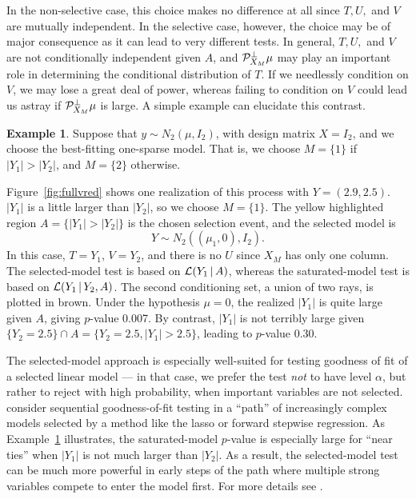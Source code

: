 \documentclass{article}
\theoremstyle{definition}
\newtheorem{example}{Example}
\newcommand{\bX}{X}
\newcommand{\proj}{\cP}
\newcommand{\cL}{\mathcal{L}}
\begin{document}
In the non-selective case, this choice makes no difference at all since $T, U,$ and $V$ are mutually independent.
In the selective case, however, the choice may be of major consequence as it can lead to very different tests. In general, $T, U,$ and $V$ are not conditionally independent given $A$, and $\proj_{\bX_M}^\perp \mu$ may play an important role in determining the conditional distribution of $T$. If we needlessly condition on $V$, we may lose a great deal of power, whereas failing to condition on $V$ could lead us astray if $\proj_{\bX_M}^\perp \mu$ is large. A simple example can elucidate this contrast.

\begin{example}\label{ex:bivar}
  Suppose that $y\sim N_2(\mu, I_2)$, with design matrix $\bX = I_2$, and we choose the best-fitting one-sparse model. That is, we choose $M=\{1\}$ if $|Y_1|>|Y_2|$, and $M=\{2\}$ otherwise.

Figure~\ref{fig:fullvred} shows one realization of this process with $Y=(2.9,2.5)$. $|Y_1|$ is a little larger than $|Y_2|$, so we choose $M=\{1\}$. The yellow highlighted region $A=\{|Y_1|>|Y_2|\}$ is the chosen selection event, and the selected model is
\begin{equation}
  Y \sim N_2\left((\mu_1,0), I_2\right).
\end{equation}
In this case, $T=Y_1$, $V=Y_2$, and there is no $U$ since $\bX_M$ has only one column. The selected-model test is based on $\cL(Y_1 \gv A)$, whereas the saturated-model test is based on $\cL(Y_1 \gv Y_2, A)$. The second conditioning set, a union of two rays, is plotted in brown. Under the hypothesis $\mu=0$, the realized $|Y_1|$ is quite large given $A$, giving $p$-value 0.007. By contrast, $|Y_1|$ is not terribly large given $\{Y_2=2.5\}\cap A = \{Y_2=2.5, |Y_1|>2.5\}$, leading to $p$-value 0.30.
\end{example}

The selected-model approach is especially well-suited for testing goodness of fit of a selected linear model --- in that case, we prefer the test {\em not} to have level $\alpha$, but rather to reject with high probability, when important variables are not selected. \citet{fithian2015adaptive} consider sequential goodness-of-fit testing in a ``path'' of increasingly complex models selected by a method like the lasso or forward stepwise regression. As Example~\ref{ex:bivar} illustrates, the saturated-model $p$-value is especially large for ``near ties'' when $|Y_1|$ is not much larger than $|Y_2|$. As a result, the selected-model test can be much more powerful in early steps of the path where multiple strong variables compete to enter the model first. For more details see \citet{fithian2015adaptive}.
\end{document}
